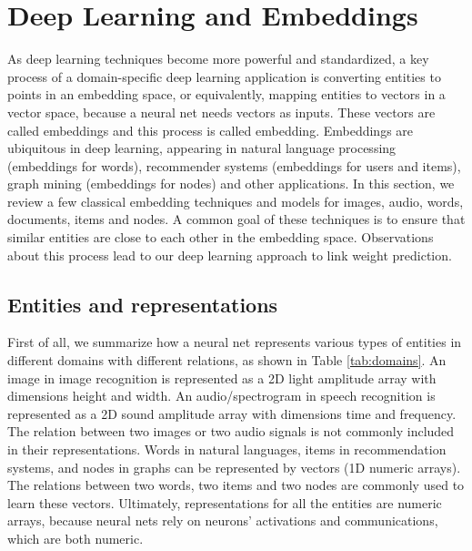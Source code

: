 \documentclass[12pt]{WSUThesis}
\theoremstyle{definition}
\begin{document}
\section{Deep Learning and Embeddings}
As deep learning techniques become more powerful and standardized,
a key process of a domain-specific deep learning application
is converting entities to points in an embedding space, or equivalently,
mapping entities to vectors in a vector space,
because a neural net needs vectors as inputs.
These vectors are called embeddings and this process is called embedding.
Embeddings are ubiquitous in deep learning,
appearing in natural language processing (embeddings for words), recommender systems (embeddings for users and items),
graph mining (embeddings for nodes) and other applications.
In this section, we review a few classical embedding techniques and models for images, audio, words, documents, items and nodes.
A common goal of these techniques is to ensure that
similar entities are close to each other in the embedding space.
Observations about this process lead to our deep learning approach to link weight prediction.

\subsection{Entities and representations}
First of all, we summarize how a neural net represents various types of 
entities in different domains with different relations, as shown in 
Table \ref{tab:domains}.
An image in image recognition is represented as
a 2D light amplitude array with dimensions height and width.
An audio/spectrogram in speech recognition is represented as
a 2D sound amplitude array with dimensions time and frequency.
The relation between two images or two audio signals is not commonly included in their representations. 
Words in natural languages, items in recommendation systems, and nodes 
in graphs can be represented by vectors (1D numeric arrays).
The	relations between two words, two items and two nodes are commonly 
used to learn these vectors.
Ultimately, representations for all the entities are numeric arrays, 
because neural nets rely on neurons' activations and communications, which 
are both numeric.
\end{document}
